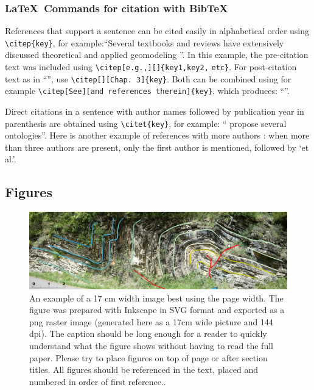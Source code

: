 \documentclass[final]{ring}
\begin{document}
\subsubsection{\LaTeX\ Commands for citation with BibTeX}

References that support a sentence can be cited easily in alphabetical order using \verb|\citep{key}|, for example:``Several textbooks and reviews have extensively discussed theoretical and applied geomodeling \citep[e.g.,][]{Mallet2002, Mallet2014, Perrin2013, Ringrose2015, Wellmann2018AG}''. In this example, the pre-citation text was included using \verb|\citep[e.g.,][]{key1,key2,| \verb|etc}|. For post-citation text as in ``\citep[chap. 3][]{Mallet2002}'', use \verb|\citep[][Chap. 3]{key}|. Both can be combined using for example \verb|\citep[See][and references therein]{key}|, which produces: ``\citep[See][and references therein]{Wellmann2018AG}''. 

Direct citations in a sentence with author names followed by publication year in parenthesis are obtained using \verb|\citet{key}|, for example: ``\citet{Perrin2013} propose several ontologies''. 
Here is another example of references with more authors \citep{Collon2017G, Freeman1990FB, Kolditz2012EES}: when more than three authors are present, only the first author is mentioned, followed by `et al.'. 

\subsection{Figures}
\begin{figure}
\centering\includegraphics[width=\textwidth]{Hecho}
\caption{An example of a 17 cm width image best using the page width. The figure was prepared with Inkscape in SVG format and exported as a png raster image (generated here as a 17cm wide picture and 144 dpi). The caption should be long enough for a reader to quickly understand what the figure shows without having to read the full paper. Please try to place figures on top of page or after section titles. All figures should be referenced in the text, placed and numbered in order of first reference..}
\label{fig:example}
\end{figure}
\end{document}
